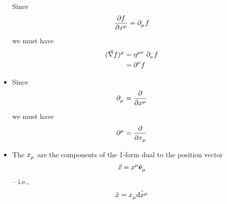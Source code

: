 \documentclass{article}
\begin{document}
\begin{itemize}

	\noindent Since
	\begin{equation*}
		\dfrac{ \partial f }{ \partial \tensor{x}{^\mu} } = \tensor{\partial}{_\mu} f
	\end{equation*}
	we must have
	\begin{align*}
		\tensor{( \vec{\nabla} f )}{^\mu} &= \tensor{\eta}{^\mu^\nu} ~ \tensor{\partial}{_\nu} f \\
		&= \tensor{\partial}{^\nu} f
	\end{align*}

	\item Since
	\begin{equation*}
		\tensor{\partial}{_\mu} = \dfrac{\partial}{ \partial \tensor{x}{^\mu} }
	\end{equation*}
	we must have
	\begin{equation*}
		\tensor{\partial}{^\mu} = \dfrac{\partial}{ \partial \tensor{x}{_\mu} }
	\end{equation*}

	\item The $\tensor{x}{_\mu}$ are the components of the 1-form dual to the position vector
	\begin{equation*}
		\vec{x} = \tensor{x}{^\mu} \tensor{\hat{\mathbf{e}}}{_\mu}
	\end{equation*}
	-- i.e.,
	\begin{equation*}
		\tilde{x} = \tensor{x}{_\mu} \tilde{ \mathrm{d} \tensor{x}{^\mu} }
	\end{equation*}

\end{itemize}
\end{document}
